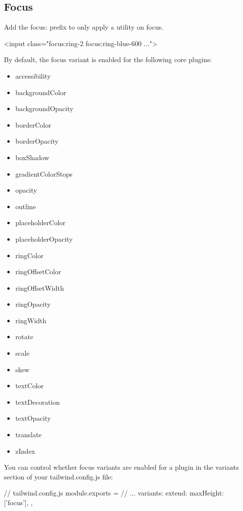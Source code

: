 \documentclass{report}
\begin{document}
    \subsection{Focus}
    \bigbreak \noindent 
    Add the focus: prefix to only apply a utility on focus.
    \bigbreak \noindent 
    \begin{htmlcode}
    <input class="focus:ring-2 focus:ring-blue-600 ...">
    \end{htmlcode}
    \bigbreak \noindent 
    By default, the focus variant is enabled for the following core plugins:
    \begin{itemize}
        \item accessibility
        \item backgroundColor
        \item backgroundOpacity
        \item borderColor
        \item borderOpacity
        \item boxShadow
        \item gradientColorStops
        \item opacity
        \item outline
        \item placeholderColor
        \item placeholderOpacity
        \item ringColor
        \item ringOffsetColor
        \item ringOffsetWidth
        \item ringOpacity
        \item ringWidth
        \item rotate
        \item scale
        \item skew
        \item textColor
        \item textDecoration
        \item textOpacity
        \item translate
        \item zIndex
    \end{itemize}
    \bigbreak \noindent 
    You can control whether focus variants are enabled for a plugin in the variants section of your tailwind.config.js file:
    \bigbreak \noindent 
    \begin{cppcode}
        // tailwind.config.js
        module.exports = {
            // ...
            variants: {
                extend: {
                    maxHeight: ['focus'],
                }
            },
        }
    \end{cppcode}
    \bigbreak \noindent 
\end{document}
